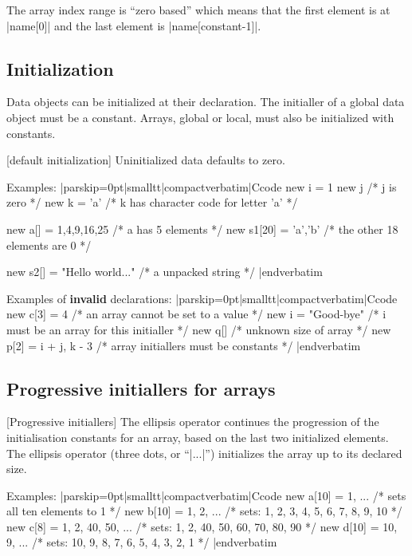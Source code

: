 The array index range is ``zero based'' which means that the first element is
at |name[0]| and the last element is |name[constant-1]|.


\subsection{Initialization}
Data objects can be initialized at their declaration.
%
The initialler of a global data object must be a constant. Arrays, global or
local, must also be initialized with constants.

 [default initialization]
Uninitialized data defaults to zero.

\goodbreak
Examples:
\listingx\verbatim|parskip=0pt|smalltt|compactverbatim|Ccode
new i = 1
new j                             /* j is zero */
new k = 'a'                       /* k has character code for letter 'a' */

new a[] = {1,4,9,16,25}           /* a has 5 elements */
new s1[20] = {'a','b'}            /* the other 18 elements are 0 */

new s2[] = "Hello world..."       /* a unpacked string */
|endverbatim\endlistingx

\goodbreak
Examples of {\bf invalid} declarations:
\listingx\verbatim|parskip=0pt|smalltt|compactverbatim|Ccode
new c[3] = 4                      /* an array cannot be set to a value */
new i = "Good-bye"                /* i must be an array for this initialler */
new q[]                           /* unknown size of array */
new p[2] = { i + j, k - 3 }       /* array initiallers must be constants */
|endverbatim\endlistingx


\subsection{Progressive initiallers for arrays}
  [Progressive initiallers]
The ellipsis operator continues the progression of the initialisation
constants for an array, based on the last two initialized elements. The
ellipsis operator (three dots, or ``|...|'') initializes the array up to its
declared size.

\goodbreak
Examples:
\listingx\verbatim|parskip=0pt|smalltt|compactverbatim|Ccode
new a[10] = { 1, ... }            /* sets all ten elements to 1 */
new b[10] = { 1, 2, ... }         /* sets: 1, 2, 3, 4, 5, 6, 7, 8, 9, 10 */
new c[8] = { 1, 2, 40, 50, ... }  /* sets: 1, 2, 40, 50, 60, 70, 80, 90 */
new d[10] = { 10, 9, ... }        /* sets: 10, 9, 8, 7, 6, 5, 4, 3, 2, 1 */
|endverbatim\endlistingx


